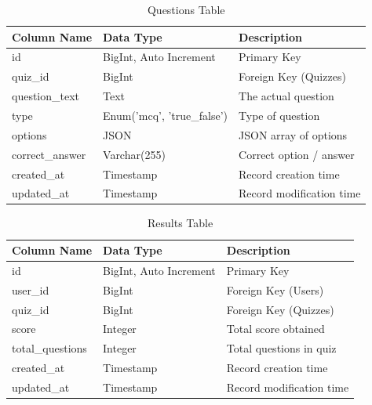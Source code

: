 \begin{table}[H]
    \centering
    \begin{tabular}{|l|l|l|}
        \hline
        \textbf{Column Name} & \textbf{Data Type} & \textbf{Description} \\
        \hline
        id & BigInt, Auto Increment & Primary Key \\
        quiz\_id & BigInt & Foreign Key (Quizzes) \\
        question\_text & Text & The actual question \\
        type & Enum('mcq', 'true\_false') & Type of question \\
        options & JSON & JSON array of options \\
        correct\_answer& Varchar(255) & Correct option / answer \\
        created\_at & Timestamp & Record creation time \\
        updated\_at & Timestamp & Record modification time \\
        \hline
    \end{tabular}
    \caption{Questions Table}
    \label{tab:questions}
\end{table}

\begin{table}[H]
    \centering
    \begin{tabular}{|l|l|l|}
        \hline
        \textbf{Column Name} & \textbf{Data Type} & \textbf{Description} \\
        \hline
        id & BigInt, Auto Increment & Primary Key \\
        user\_id & BigInt & Foreign Key (Users) \\
        quiz\_id & BigInt & Foreign Key (Quizzes) \\
        score & Integer & Total score obtained \\
        total\_questions & Integer & Total questions in quiz \\
        created\_at & Timestamp & Record creation time \\
        updated\_at & Timestamp & Record modification time \\
        \hline
    \end{tabular}
    \caption{Results Table}
    \label{tab:results}
\end{table}

